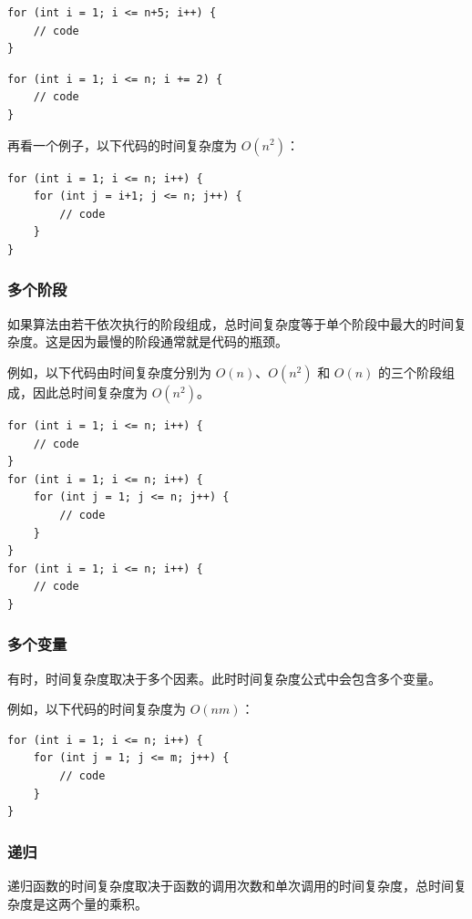 \begin{lstlisting}
for (int i = 1; i <= n+5; i++) {
    // code
}
\end{lstlisting}

\begin{lstlisting}
for (int i = 1; i <= n; i += 2) {
    // code
}
\end{lstlisting}

再看一个例子，以下代码的时间复杂度为 $O(n^2)$：

\begin{lstlisting}
for (int i = 1; i <= n; i++) {
    for (int j = i+1; j <= n; j++) {
        // code
    }
}
\end{lstlisting}

\subsubsection*{多个阶段}

如果算法由若干依次执行的阶段组成，总时间复杂度等于单个阶段中最大的时间复杂度。这是因为最慢的阶段通常就是代码的瓶颈。

例如，以下代码由时间复杂度分别为 $O(n)$、$O(n^2)$ 和 $O(n)$ 的三个阶段组成，因此总时间复杂度为 $O(n^2)$。

\begin{lstlisting}
for (int i = 1; i <= n; i++) {
    // code
}
for (int i = 1; i <= n; i++) {
    for (int j = 1; j <= n; j++) {
        // code
    }
}
for (int i = 1; i <= n; i++) {
    // code
}
\end{lstlisting}

\subsubsection*{多个变量}

有时，时间复杂度取决于多个因素。此时时间复杂度公式中会包含多个变量。

例如，以下代码的时间复杂度为 $O(nm)$：

\begin{lstlisting}
for (int i = 1; i <= n; i++) {
    for (int j = 1; j <= m; j++) {
        // code
    }
}
\end{lstlisting}

\subsubsection*{递归}

递归函数的时间复杂度取决于函数的调用次数和单次调用的时间复杂度，总时间复杂度是这两个量的乘积。


